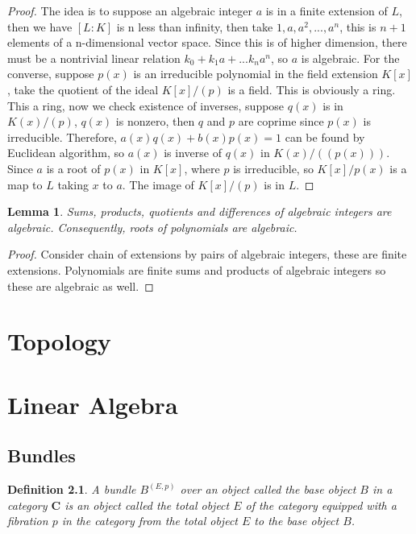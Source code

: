 \documentclass{tufte-book}
\newtheorem{definition}[theorem]{Definition}
\newtheorem{lemma}[theorem]{Lemma}
\begin{document}
\begin{proof}
The idea is to suppose an algebraic integer $a$ is in a finite extension of $L$, then we have $[L:K]$ is n less than infinity, then take $1, a, a^2, ..., a^n$, this is $n + 1$ elements of a n-dimensional vector space. Since this is of higher dimension, there must be a nontrivial linear relation $k_0 + k_1 a + ... k_n a^n$, so $a$ is algebraic. For the converse, suppose $p(x)$ is an irreducible polynomial in the field extension $K[x]$, take the quotient of the ideal $K[x]/(p)$ is a field. This is obviously a ring. This a ring, now we check existence of inverses, suppose $q(x)$ is in $K(x)/(p)$, $q(x)$ is nonzero, then $q$ and $p$ are coprime since $p(x)$ is irreducible. Therefore, $a(x)q(x) + b(x) p(x) = 1$ can be found by Euclidean algorithm, so $a(x)$ is inverse of $q(x)$ in $K(x)/((p(x)))$. Since $a$ is a root of $p(x)$ in $K[x]$, where $p$ is irreducible, so $K[x]/p(x)$ is a map to $L$ taking $x$ to $a$. The image of $K[x]/(p)$ is in $L$.
\end{proof}

\begin{lemma}
    Sums, products, quotients and differences of algebraic integers are algebraic. Consequently, roots of polynomials are algebraic.
\end{lemma}

\begin{proof}
    Consider chain of extensions by pairs of algebraic integers, these are finite extensions. Polynomials are finite sums and products of algebraic integers so these are algebraic as well.
\end{proof}

\chapter{Topology}

\chapter{Linear Algebra}
\label{ch:lin-alg}

\section{Bundles}

\begin{definition}
	A bundle $B^{(E,p)}$ over an object called the base object $B$ in a category $\mathbf{C}$ is an object called the total object $E$ of the category equipped with a fibration $p$ in the category from the total object $E$ to the base object $B$.
\end{definition}
\end{document}
